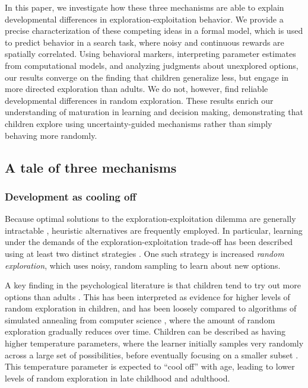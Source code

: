 \documentclass[a4paper,man, floatsintext, natbib]{apa6}
\begin{document}
In this paper, we investigate how these three mechanisms are able to explain developmental differences in exploration-exploitation behavior. We provide a precise characterization of these competing ideas in a formal model, which is used to predict behavior in a search task, where noisy and continuous rewards are spatially correlated. Using behavioral markers, interpreting parameter estimates from computational models, and analyzing judgments about unexplored options, our results converge on the finding that children generalize less, but engage in more directed exploration than adults. We do not, however, find reliable developmental differences in random exploration. These results enrich our understanding of maturation in learning and decision making, demonstrating that children explore using uncertainty-guided mechanisms rather than simply behaving more randomly.

\subsection*{A tale of three mechanisms} 
\subsubsection{Development as cooling off} 
Because optimal solutions to the exploration-exploitation dilemma are generally intractable \citep{bellman1952theory}, heuristic alternatives are frequently employed. In particular, learning under the demands of the exploration-exploitation trade-off has been described using at least two distinct strategies \citep{wilson2014humans}. One such strategy is increased \emph{random exploration}, which uses noisy, random sampling to learn about new options. 

A key finding in the psychological literature is that children tend to try out more options than adults \citep{cauffman2010age, mata2013foraging}. This has been interpreted as evidence for higher levels of random exploration in children, and has been loosely compared to algorithms of simulated annealing from computer science \citep{gopnik2017changes}, where the amount of random exploration gradually reduces over time. Children can be described as having higher temperature parameters, where the learner initially samples very randomly across a large set of possibilities, before eventually focusing on a smaller subset \citep{gopnik2015younger}. This temperature parameter is expected to ``cool off'' with age, leading to lower levels of random exploration in late childhood and adulthood. 
\end{document}
